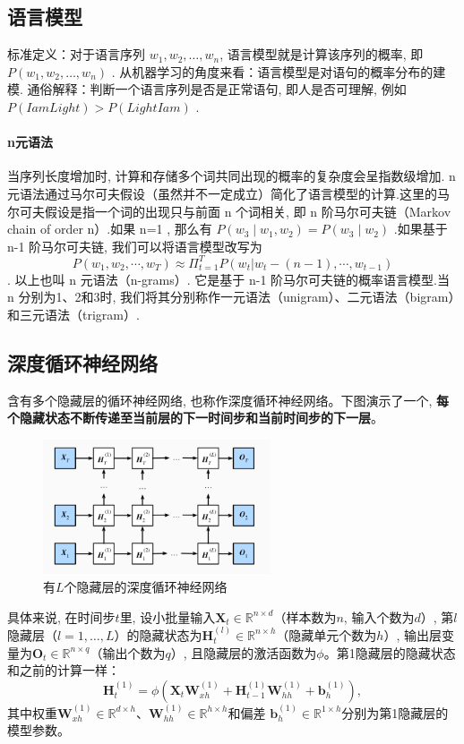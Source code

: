 \documentclass[a4paper]{article}
\begin{document}
\subsection{语言模型}

标准定义：对于语言序列 $w_1, w_2, \dots,  w_n$, 语言模型就是计算该序列的概率, 即 $P(w_1, w_2,  \dots,  w_n)$ .
从机器学习的角度来看：语言模型是对语句的概率分布的建模.
通俗解释：判断一个语言序列是否是正常语句, 即人是否可理解, 例如 $P(I am Light) > P(Light I am)$ .
\paragraph{n元语法}

当序列长度增加时, 计算和存储多个词共同出现的概率的复杂度会呈指数级增加. n 元语法通过马尔可夫假设（虽然并不一定成立）简化了语言模型的计算.这里的马尔可夫假设是指一个词的出现只与前面 n 个词相关, 即 n 阶马尔可夫链（Markov chain of order n）.如果 n=1 , 那么有 $P(w_3∣w_1, w_2)=P(w_3∣w_2)$ .如果基于 n-1 阶马尔可夫链, 我们可以将语言模型改写为
$$P(w_1, w_2, \cdots , w_T) \approx \Pi_{t=1}^T P(w_t|w_t-(n-1), \cdots, w_{t-1})$$.
以上也叫 n 元语法（n-grams）. 它是基于 n-1 阶马尔可夫链的概率语言模型.当 n 分别为1、2和3时, 我们将其分别称作一元语法（unigram）、二元语法（bigram）和三元语法（trigram）.

\subsection{深度循环神经网络}
含有多个隐藏层的循环神经网络, 也称作深度循环神经网络。下图演示了一个, \textbf{每个隐藏状态不断传递至当前层的下一时间步和当前时间步的下一层}。

 \begin{figure}[!htb]
    \center
\includegraphics[width=0.6\textwidth]{deep_rnn.png}
\caption{有$L$个隐藏层的深度循环神经网络}
\end{figure}
 

具体来说, 在时间步$t$里, 设小批量输入$\mathbf{X}_t \in \mathbb{R}^{n \times d}$（样本数为$n$, 输入个数为$d$）, 第$l$隐藏层（$l=1, \ldots, L$）的隐藏状态为$\mathbf{H}_t^{(l)}  \in \mathbb{R}^{n \times h}$（隐藏单元个数为$h$）, 输出层变量为$\mathbf{O}_t \in \mathbb{R}^{n \times q}$（输出个数为$q$）, 且隐藏层的激活函数为$\phi$。第1隐藏层的隐藏状态和之前的计算一样：
$$\mathbf{H}_t^{(1)} = \phi(\mathbf{X}_t \mathbf{W}_{xh}^{(1)} + \mathbf{H}_{t-1}^{(1)} \mathbf{W}_{hh}^{(1)}  + \mathbf{b}_h^{(1)}), $$
其中权重$\mathbf{W}_{xh}^{(1)} \in \mathbb{R}^{d \times h}$、$\mathbf{W}_{hh}^{(1)} \in \mathbb{R}^{h \times h}$和偏差 $\mathbf{b}_h^{(1)} \in \mathbb{R}^{1 \times h}$分别为第1隐藏层的模型参数。
\end{document}
